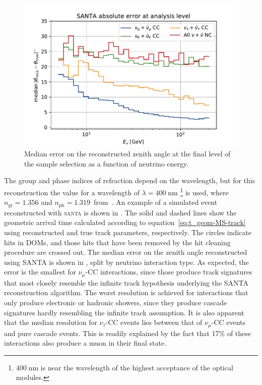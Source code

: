 \begin{figure}
    \centering
    \includegraphics[width=0.8\linewidth]{figures/icecube/reconstruction/santa/santa_absolute_error_final.pdf}
    \caption{Median error on the reconstructed zenith angle at the final level of the sample selection as a function of neutrino energy.}
    \label{fig:santa-resolution}
\end{figure}

The group and phase indices of refraction depend on the wavelength, but for this reconstruction the value for a wavelength of $\lambda=400\;\mathrm{nm}$
\footnote{$400\;\mathrm{nm}$ is near the wavelength of the highest acceptance of the optical modules.\cite{icecube_detector_17}} is used, where $n_{\mathrm{gr}}=1.356$ and $n_{\mathrm{ph}}=1.319$~from~. An example of a simulated event reconstructed with \textsc{santa} is shown in . The solid and dashed lines show the geometric arrival time calculated according to equation~\ref{eq:t_geom-MS-track} using reconstructed and true track parameters, respectively. The circles indicate hits in DOMs, and those hits that have been removed by the hit cleaning procedure are crossed out. The median error on the zenith angle reconstructed using \textsc{SANTA} is shown in , split by neutrino interaction type. As expected, the error is the smallest for $\nu_\mu$-CC interactions, since those produce track signatures that most closely resemble the infinite track hypothesis underlying the \textsc{SANTA} reconstruction algorithm. The worst resolution is achieved for interactions that only produce electronic or hadronic showers, since they produce cascade signatures hardly resembling the infinite track assumption. It is also apparent that the median resolution for $\nu_\tau$-CC events lies between that of $\nu_\mu$-CC events and pure cascade events. This is readily explained by the fact that 17\% of these interactions also produce a muon in their final state.

